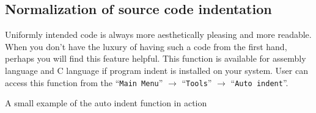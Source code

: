 \documentclass[a4paper,twoside,12pt]{book}
\newcommand{\menuitem}[1]{\texttt{#1}}
\begin{document}
		\subsection{Normalization of source code indentation}
			Uniformly intended code is always more aesthetically pleasing and more readable. When you don't have the luxury of having such a code from the first hand, perhaps you will find this feature helpful. This function is available for assembly language and C language if program indent is installed on your system. User can access this function from the ``\menuitem{Main Menu}'' $\rightarrow$ ``\menuitem{Tools}'' $\rightarrow$ ``\menuitem{Auto indent}''.

			\noindent
			\begin{center}
				\small{A small example of the auto indent function in action}
			\end{center}
\end{document}
